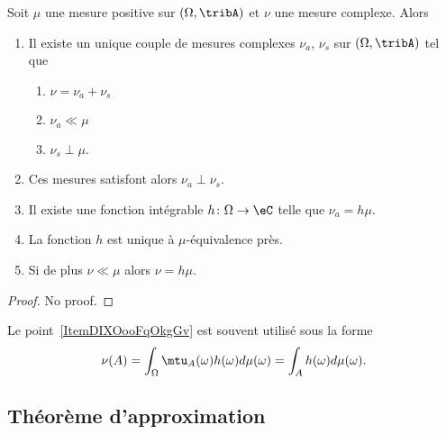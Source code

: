 	\begin{theorem}\label{ThoZZMGooKhRYaO}
	Soit \( \mu\) une mesure positive sur \( (\Omega,\tribA)\) et \( \nu\) une mesure complexe. Alors
	\begin{enumerate}
	\item
	Il existe un unique couple de mesures complexes \( \nu_a\), \( \nu_s\) sur \( (\Omega,\tribA)\) tel que
	\begin{enumerate}
	\item
\( \nu=\nu_a+\nu_s\)
	\item
\( \nu_a\ll\mu\)
	\item
	\( \nu_s\perp \mu\).
	\end{enumerate}
	\item
	Ces mesures satisfont alors \( \nu_a\perp\nu_s\).
	\item
	Il existe une fonction intégrable \( h\colon \Omega\to \eC\) telle que \( \nu_a=h\mu\).
	\item
	La fonction \( h\) est unique à \( \mu\)-équivalence près.
	\item   \label{ItemDIXOooFqOkgGv}
	Si de plus \( \nu\ll \mu\) alors \( \nu=h\mu\).
	\end{enumerate}
	\end{theorem}
	\begin{proof}
	No proof.
	\end{proof}

	\begin{remark}  \label{RemSYRMooZPBhbQ}
	Le point~\ref{ItemDIXOooFqOkgGv} est souvent utilisé sous la forme
	\begin{equation}
	\nu(A)=\int_{\Omega}\mtu_A(\omega)h(\omega)d\mu(\omega)=\int_{A}h(\omega)d\mu(\omega).
	\end{equation}
	\end{remark}

	\subsection{Théorème d'approximation}

